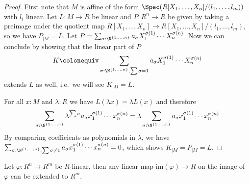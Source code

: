 \begin{proof}
  First note that $M$ is affine of the form $\Spec(R[X_1,\dots,X_n]/(l_1,\dots,l_m))$ with $l_i$ linear.
  Let $L:M\to R$ be linear and $P:R^n\to R$ be given by taking a preimage under the quotient map $R[X_1,\dots,X_n]\to R[X_1,\dots,X_n]/(l_1,\dots,l_m)$,
  so we have $P_{\vert M}=L$.
  Let $P=\sum_{\sigma:\N^{\{1,\dots,n\}}}a_\sigma X_1^{\sigma(1)}\cdots X_n^{\sigma(n)}$.
  Now we can conclude by showing that the linear part of $P$
  \[
    K\colonequiv \sum_{\sigma:\N^{\{1,\dots,n\}}, \sum \sigma =1}a_\sigma X_1^{\sigma(1)}\cdots X_n^{\sigma(n)}
  \]
  extends $L$ as well, i.e.\ we will see $K_{\vert M}=L$.
  
  For all $x:M$ and $\lambda : R$ we have $L(\lambda x)=\lambda L(x)$ and therefore
  \[
    \sum_{\sigma:\N^{\{1,\dots,n\}}}\lambda^{\sum\sigma} a_\sigma x_1^{\sigma(1)}\cdots x_n^{\sigma(n)}=\lambda \sum_{\sigma:\N^{\{1,\dots,n\}}} a_\sigma x_1^{\sigma(1)}\cdots x_n^{\sigma(n)}
  \]
  By comparing coefficients as polynomials in $\lambda$, we have $\sum_{\sigma:\N^{\{1,\dots,n\}}, \sum \sigma \neq 1}a_\sigma x_1^{\sigma(1)}\cdots x_n^{\sigma(n)}=0$,
  which shows $K_{\vert M}=P_{\vert M}=L$.
\end{proof}

\begin{lemma}
  \label{extend-from-image}
  Let $\varphi:R^n\to R^m$ be $R$-linear, then any linear map $\mathrm{im}(\varphi)\to R$ on the image of $\varphi$ can be extended to $R^m$.
\end{lemma}

